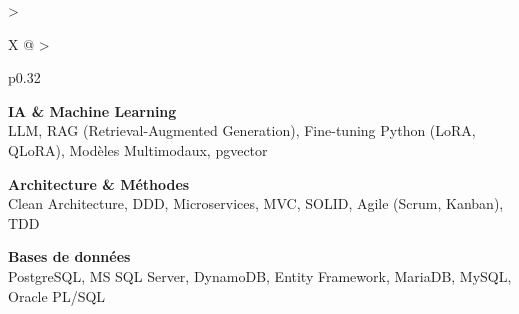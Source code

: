 \documentclass[10pt,a4paper]{article}
\begin{document}
\begin{tabularx}{\textwidth}{
  >{\raggedright\arraybackslash}X
  @{\hspace{1cm}}
  >{\raggedright\arraybackslash}p{0.32\textwidth}
}
\begin{minipage}[t]{\linewidth}
\vspace{4pt}

\textbf{\color{primary} IA \& Machine Learning}\\
\color{darkgray} LLM, RAG (Retrieval-Augmented Generation), Fine-tuning Python (LoRA, QLoRA), Modèles Multimodaux, pgvector

\vspace{4pt}

\textbf{\color{primary} Architecture \& Méthodes}\\
\color{darkgray} Clean Architecture, DDD, Microservices, MVC, SOLID, Agile (Scrum, Kanban), TDD

\vspace{4pt}

\textbf{\color{primary} Bases de données}\\
\color{darkgray} PostgreSQL, MS SQL Server, DynamoDB, Entity Framework, MariaDB, MySQL, Oracle PL/SQL

\vspace{4pt}

\end{minipage}
\\
\end{tabularx}
\end{document}

